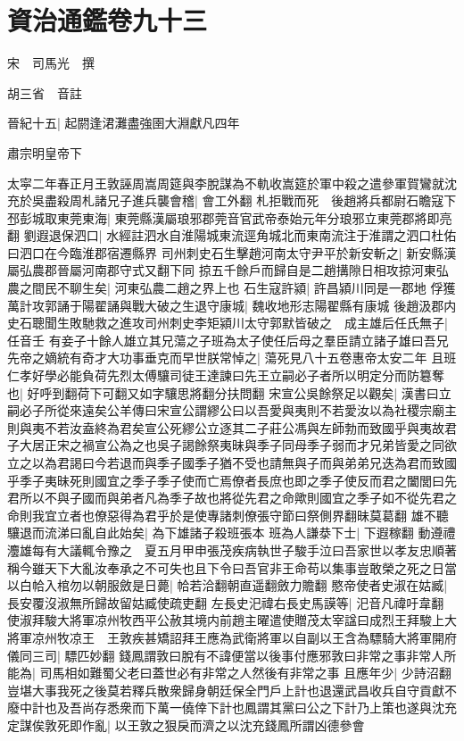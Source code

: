 \chapter{資治通鑑卷九十三}
宋　司馬光　撰

胡三省　音註

晉紀十五|{
	起閼逢涒灘盡強圉大淵獻凡四年}


肅宗明皇帝下

太寜二年春正月王敦誣周嵩周筵與李脫謀為不軌收嵩筵於軍中殺之遣參軍賀鸞就沈充於吳盡殺周札諸兄子進兵襲會稽|{
	會工外翻}
札拒戰而死　後趙將兵都尉石瞻寇下邳彭城取東莞東海|{
	東莞縣漢屬琅邪郡莞音官武帝泰始元年分琅邪立東莞郡將即亮翻}
劉遐退保泗口|{
	水經註泗水自淮陽城東流逕角城北而東南流注于淮謂之泗口杜佑曰泗口在今臨淮郡宿遷縣界}
司州刺史石生擊趙河南太守尹平於新安斬之|{
	新安縣漢屬弘農郡晉屬河南郡守式又翻下同}
掠五千餘戶而歸自是二趙搆隙日相攻掠河東弘農之間民不聊生矣|{
	河東弘農二趙之界上也}
石生寇許潁|{
	許昌潁川同是一郡地}
俘獲萬計攻郭誦于陽翟誦與戰大破之生退守康城|{
	魏收地形志陽翟縣有康城}
後趙汲郡内史石聰聞生敗馳救之進攻司州刺史李矩潁川太守郭默皆破之　成主雄后任氏無子|{
	任音壬}
有妾子十餘人雄立其兄蕩之子班為太子使任后母之羣臣請立諸子雄曰吾兄先帝之嫡統有奇才大功事垂克而早世朕常悼之|{
	蕩死見八十五卷惠帝太安二年}
且班仁孝好學必能負荷先烈太傅驤司徒王達諫曰先王立嗣必子者所以明定分而防簒奪也|{
	好呼到翻荷下可翻又如字驤思將翻分扶問翻}
宋宣公吳餘祭足以觀矣|{
	漢書曰立嗣必子所從來遠矣公羊傳曰宋宣公謂繆公曰以吾愛與夷則不若愛汝以為社稷宗廟主則與夷不若汝盍終為君矣宣公死繆公立逐其二子莊公馮與左師勃而致國乎與夷故君子大居正宋之禍宣公為之也吳子謁餘祭夷昧與季子同母季子弱而才兄弟皆愛之同欲立之以為君謁曰今若退而與季子國季子猶不受也請無與子而與弟弟兄迭為君而致國乎季子夷昧死則國宜之季子季子使而亡焉僚者長庶也即之季子使反而君之闔閭曰先君所以不與子國而與弟者凡為季子故也將從先君之命歟則國宜之季子如不從先君之命則我宜立者也僚惡得為君乎於是使專諸刺僚張守節曰祭側界翻昧莫葛翻}
雄不聽驤退而流涕曰亂自此始矣|{
	為下雄諸子殺班張本}
班為人謙㳟下士|{
	下遐稼翻}
動遵禮灋雄每有大議輒令豫之　夏五月甲申張茂疾病執世子駿手泣曰吾家世以孝友忠順著稱今雖天下大亂汝奉承之不可失也且下令曰吾官非王命苟以集事豈敢榮之死之日當以白帢入棺勿以朝服斂是日薨|{
	帢若洽翻朝直遥翻斂力贍翻}
愍帝使者史淑在姑臧|{
	長安覆沒淑無所歸故留姑臧使疏吏翻}
左長史汜禕右長史馬謨等|{
	汜音凡禕吁韋翻}
使淑拜駿大將軍凉州牧西平公赦其境内前趙主曜遣使贈茂太宰諡曰成烈王拜駿上大將軍凉州牧凉王　王敦疾甚矯詔拜王應為武衛將軍以自副以王含為驃騎大將軍開府儀同三司|{
	驃匹妙翻}
錢鳳謂敦曰脫有不諱便當以後事付應邪敦曰非常之事非常人所能為|{
	司馬相如難蜀父老曰蓋世必有非常之人然後有非常之事}
且應年少|{
	少詩沼翻}
豈堪大事我死之後莫若釋兵散衆歸身朝廷保全門戶上計也退還武昌收兵自守貢獻不廢中計也及吾尚存悉衆而下萬一僥倖下計也鳳謂其黨曰公之下計乃上策也遂與沈充定謀俟敦死即作亂|{
	以王敦之狠戾而濟之以沈充錢鳳所謂凶德參會}
